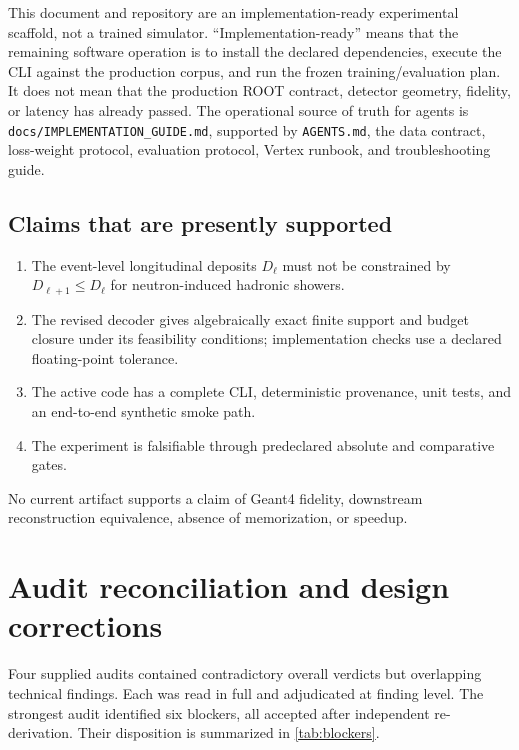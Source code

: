 \documentclass[10pt,a4paper]{article}
\begin{document}
This document and repository are an implementation-ready experimental scaffold, not a trained simulator. ``Implementation-ready'' means that the remaining software operation is to install the declared dependencies, execute the CLI against the production corpus, and run the frozen training/evaluation plan. It does not mean that the production ROOT contract, detector geometry, fidelity, or latency has already passed. The operational source of truth for agents is \texttt{docs/IMPLEMENTATION\_GUIDE.md}, supported by \texttt{AGENTS.md}, the data contract, loss-weight protocol, evaluation protocol, Vertex runbook, and troubleshooting guide.

\subsection{Claims that are presently supported}
\begin{enumerate}
\item The event-level longitudinal deposits $D_\ell$ must not be constrained by $D_{\ell+1}\le D_\ell$ for neutron-induced hadronic showers.
\item The revised decoder gives algebraically exact finite support and budget closure under its feasibility conditions; implementation checks use a declared floating-point tolerance.
\item The active code has a complete CLI, deterministic provenance, unit tests, and an end-to-end synthetic smoke path.
\item The experiment is falsifiable through predeclared absolute and comparative gates.
\end{enumerate}

No current artifact supports a claim of Geant4 fidelity, downstream reconstruction equivalence, absence of memorization, or speedup.

\section{Audit reconciliation and design corrections}

Four supplied audits contained contradictory overall verdicts but overlapping technical findings. Each was read in full and adjudicated at finding level. The strongest audit identified six blockers, all accepted after independent re-derivation. Their disposition is summarized in \cref{tab:blockers}.
\end{document}
